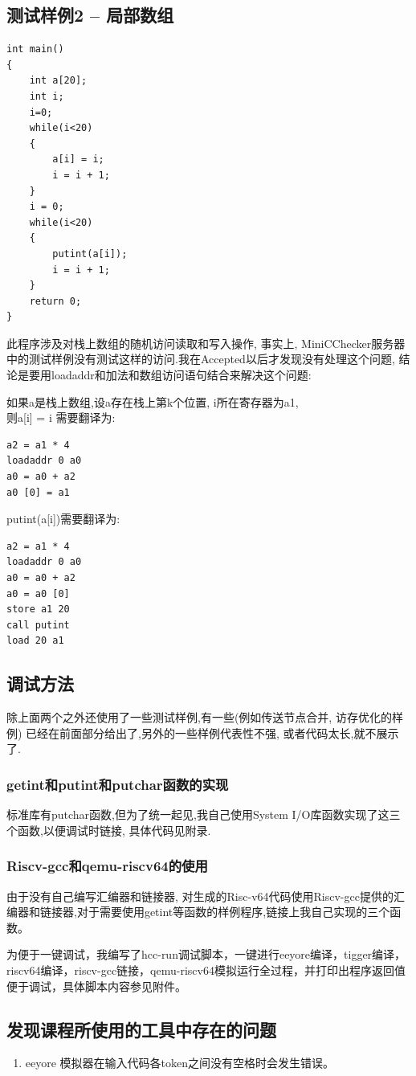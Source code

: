 \documentclass[UTF8]{article}
\begin{document}
\subsection{测试样例2 -- 局部数组}
\begin{lstlisting}
int main()
{
	int a[20];
	int i;
	i=0;
	while(i<20)
	{
		a[i] = i;
		i = i + 1;
	}
	i = 0;
	while(i<20)
	{
		putint(a[i]);
		i = i + 1;
	}
	return 0;
}
\end{lstlisting}

此程序涉及对栈上数组的随机访问读取和写入操作, 事实上, MiniCChecker服务器中的测试样例没有测试这样的访问.我在Accepted以后才发现没有处理这个问题, 结论是要用loadaddr和加法和数组访问语句结合来解决这个问题:

如果a是栈上数组,设a存在栈上第k个位置, i所在寄存器为a1, 
\\则a[i] = i 需要翻译为:
\begin{lstlisting}
a2 = a1 * 4
loadaddr 0 a0
a0 = a0 + a2
a0 [0] = a1
\end{lstlisting}
putint(a[i])需要翻译为:
\begin{lstlisting}
a2 = a1 * 4
loadaddr 0 a0
a0 = a0 + a2
a0 = a0 [0]
store a1 20
call putint
load 20 a1
\end{lstlisting}

\subsection{调试方法}
除上面两个之外还使用了一些测试样例,有一些(例如传送节点合并, 访存优化的样例) 已经在前面部分给出了,另外的一些样例代表性不强, 或者代码太长,就不展示了.
\subsubsection{getint和putint和putchar函数的实现}
标准库有putchar函数,但为了统一起见,我自己使用System I/O库函数实现了这三个函数,以便调试时链接,
具体代码见附录.
\subsubsection{Riscv-gcc和qemu-riscv64的使用}
由于没有自己编写汇编器和链接器, 对生成的Risc-v64代码使用Riscv-gcc提供的汇编器和链接器,对于需要使用getint等函数的样例程序,链接上我自己实现的三个函数。

为便于一键调试，我编写了hcc-run调试脚本，一键进行eeyore编译，tigger编译，riscv64编译，riscv-gcc链接，qemu-riscv64模拟运行全过程，并打印出程序返回值便于调试，具体脚本内容参见附件。
\subsection{发现课程所使用的工具中存在的问题}
\begin{enumerate}
\item eeyore 模拟器在输入代码各token之间没有空格时会发生错误。
\end{enumerate}
\end{document}
